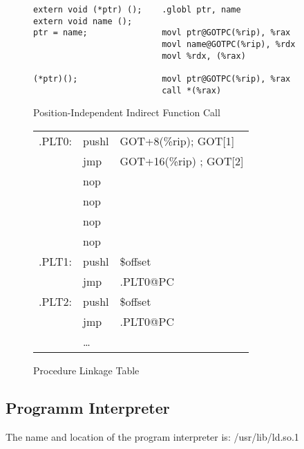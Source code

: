 \begin{figure}[H]
\caption{Position-Independent Indirect Function Call}
\begin{verbatim}
extern void (*ptr) ();    .globl ptr, name
extern void name ();
ptr = name;               movl ptr@GOTPC(%rip), %rax
                          movl name@GOTPC(%rip), %rdx
                          movl %rdx, (%rax)

(*ptr)();                 movl ptr@GOTPC(%rip), %rax
                          call *(%rax)
\end{verbatim}
\end{figure}


\begin{figure}[H]
\caption{Procedure Linkage Table}
\begin{tabular}{lll}
.PLT0: & pushl & GOT+8(\%rip); GOT[1]\\
& jmp &GOT+16(\%rip) ; GOT[2] \\
& nop & \\
& nop & \\
& nop & \\
& nop & \\
.PLT1: & pushl & \$offset \\
&jmp &.PLT0@PC \\
.PLT2: &pushl & \$offset \\
& jmp & .PLT0@PC \\
&\dots\\
\end{tabular}
\end{figure}



\subsection{Programm Interpreter}

The name and location of the program interpreter is:
/usr/lib/ld.so.1

